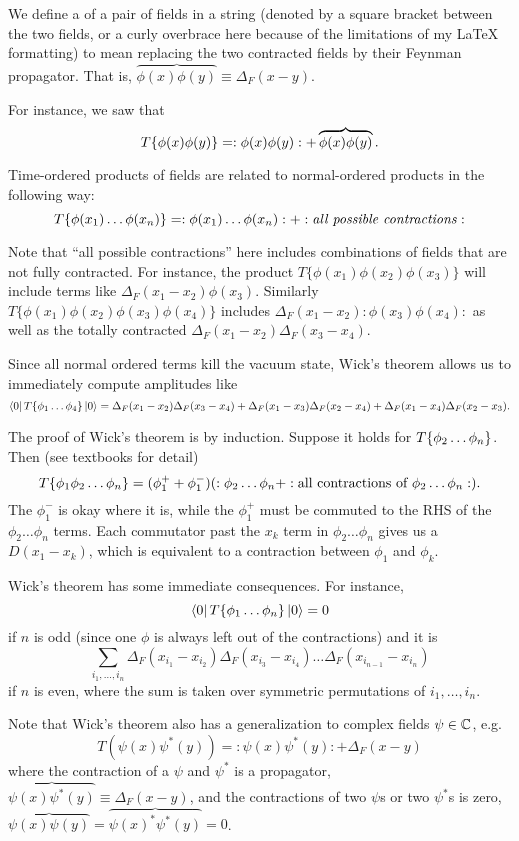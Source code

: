 \begin{defn}
We define a  of a pair of fields in a string (denoted by a square bracket between the two fields, or a curly overbrace here because of the limitations of my \LaTeX{} formatting) to mean replacing the two contracted fields by their Feynman propagator. That is, $\overbrace{\phi(x)\phi(y)} \equiv \Delta_F(x-y).$

For instance, we saw that
$$T\{\phi(x)\phi(y)\}=:\phi(x)\phi(y):+\overbrace{\phi(x)\phi(y)}.$$
\end{defn}
\begin{thm}
Time-ordered products of fields are related to normal-ordered products in the following way: %
\begin{equation}
    T\{\phi(x_1)\ldots \phi(x_n)\}=:\phi(x_1)\ldots \phi(x_n):+:\text{\emph{all possible contractions}}:
\end{equation}
\end{thm}

Note that ``all possible contractions'' here includes combinations of fields that are not fully contracted. For instance, the product $T\{\phi(x_1)\phi(x_2)\phi(x_3)\}$ will include terms like $\Delta_F(x_1-x_2)\phi(x_3)$. Similarly $T\{\phi(x_1)\phi(x_2)\phi(x_3)\phi(x_4)\}$ includes $\Delta_F(x_1-x_2):\phi(x_3)\phi(x_4):$ as well as the totally contracted $\Delta_F(x_1-x_2)\Delta_F(x_3-x_4)$.

\begin{exm}
Since all normal ordered terms kill the vacuum state, Wick's theorem allows us to immediately compute amplitudes like
$$\left< 0 \right|T\{\phi_1\ldots \phi_4\}\left| 0 \right>=\Delta_F (x_1-x_2)\Delta_F(x_3-x_4)+\Delta_F(x_1-x_3)\Delta_F(x_2-x_4)+\Delta_F(x_1-x_4)\Delta_F(x_2-x_3).$$
\end{exm}

The proof of Wick's theorem is by induction. Suppose it holds for $T\{\phi_2\ldots \phi_n\}$. Then (see textbooks for detail)
$$T\{\phi_1 \phi_2\ldots \phi_n\}=(\phi_1^+ +\phi_1^-)(:\phi_2\ldots \phi_n+:\text{all contractions of }\phi_2\ldots \phi_n:).$$
The $\phi_1^-$ is okay where it is, while the $\phi_1^+$ must be commuted to the RHS of the $\phi_2\ldots \phi_n$ terms. Each commutator past the $x_k$ term in $\phi_2\ldots \phi_n$ gives us a $D(x_1-x_k)$, which is equivalent to a contraction between $\phi_1$ and $\phi_k$.

Wick's theorem has some immediate consequences. For instance,
$$\left< 0 \right|T \{\phi_1\ldots \phi_n\}\left| 0 \right>=0$$ if $n$ is odd (since one $\phi$ is always left out of the contractions) and it is
$$\sum_{i_1,\ldots,i_n}\Delta_F (x_{i_1}-x_{i_2})\Delta_F(x_{i_3}-x_{i_4})\ldots \Delta_F(x_{i_{n-1}}-x_{i_n})$$
if $n$ is even, where the sum is taken over symmetric permutations of $i_1,\ldots,i_n$.

Note that Wick's theorem also has a generalization to complex fields $\psi\in \mathbb{C}$, e.g.
$$T(\psi(x)\psi^*(y))=:\psi(x)\psi^*(y):+\Delta_F(x-y)$$
where the contraction of a $\psi$ and $\psi^*$ is a propagator, $\overbrace{\psi(x)\psi^*(y)}\equiv \Delta_F(x-y)$, and the contractions of two $\psi$s or two $\psi^*$s is zero, $\overbrace{\psi(x)\psi(y)}=\overbrace{\psi(x)^*\psi^*(y)}=0$.